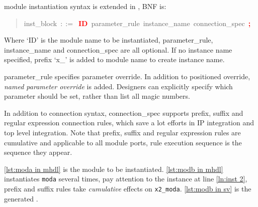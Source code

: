 \vlog{} module instantiation syntax is extended in \mhdl{}, BNF is:
\begin{quote}
\mbox{inst\_block $::=$\hspace{1ex} \textbf{\textcolor{red}{ID}} parameter\_rule instance\_name connection\_spec \textbf{\textcolor{red}{;}}}
\end{quote}
Where `ID' is the module name to be instantiated,
parameter\_rule, instance\_name and connection\_spec are all optional. 
If no instance name specified, prefix `x\_' is added to module name to create
instance name. 

parameter\_rule specifies parameter override. In addition to \vlog{}
positioned override,
\emph{named parameter override} is added. Designers can explicitly specify which parameter 
should be set, rather than list all magic numbers.

In addition to \vlog{} connection syntax, connection\_spec supports
prefix, suffix and regular expression connection rules, which save a
lot efforts in IP integration and top level integration.  Note that
prefix, suffix and regular expression rules are cumulative and
applicable to all module ports, rule execution sequence is the
sequence they appear.

\autoref{lst:moda in mhdl} is the module to be instantiated.
\autoref{lst:modb in mhdl} instantiates \texttt{moda} several times, 
pay attention to the instance at line \autoref{ln:inst 2},
prefix and suffix rules take \emph{cumulative} effects
on \texttt{x2\_moda}.
\autoref{lst:modb in sv} is the generated \sv{}. 

